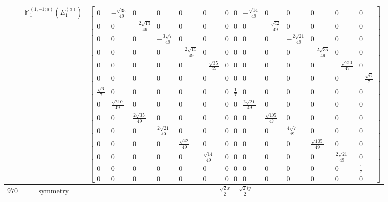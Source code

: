\documentclass[fleqn,8pt,landscape]{jsarticle}
\begin{document}
\begin{longtable}{ccc}
$  $ & $ \mathbb{M}_{1}^{(1,-1;a)}(E_{1}^{(a)}) $ & $ \begin{bmatrix} 0 & - \frac{\sqrt{35}}{49} & 0 & 0 & 0 & 0 & 0 & 0 & - \frac{\sqrt{14}}{49} & 0 & 0 & 0 & 0 & 0 \\ 0 & 0 & - \frac{2 \sqrt{14}}{49} & 0 & 0 & 0 & 0 & 0 & 0 & - \frac{\sqrt{42}}{49} & 0 & 0 & 0 & 0 \\ 0 & 0 & 0 & - \frac{3 \sqrt{7}}{49} & 0 & 0 & 0 & 0 & 0 & 0 & - \frac{2 \sqrt{21}}{49} & 0 & 0 & 0 \\ 0 & 0 & 0 & 0 & - \frac{2 \sqrt{14}}{49} & 0 & 0 & 0 & 0 & 0 & 0 & - \frac{2 \sqrt{35}}{49} & 0 & 0 \\ 0 & 0 & 0 & 0 & 0 & - \frac{\sqrt{35}}{49} & 0 & 0 & 0 & 0 & 0 & 0 & - \frac{\sqrt{210}}{49} & 0 \\ 0 & 0 & 0 & 0 & 0 & 0 & 0 & 0 & 0 & 0 & 0 & 0 & 0 & - \frac{\sqrt{6}}{7} \\ \frac{\sqrt{6}}{7} & 0 & 0 & 0 & 0 & 0 & 0 & \frac{1}{7} & 0 & 0 & 0 & 0 & 0 & 0 \\ 0 & \frac{\sqrt{210}}{49} & 0 & 0 & 0 & 0 & 0 & 0 & \frac{2 \sqrt{21}}{49} & 0 & 0 & 0 & 0 & 0 \\ 0 & 0 & \frac{2 \sqrt{35}}{49} & 0 & 0 & 0 & 0 & 0 & 0 & \frac{\sqrt{105}}{49} & 0 & 0 & 0 & 0 \\ 0 & 0 & 0 & \frac{2 \sqrt{21}}{49} & 0 & 0 & 0 & 0 & 0 & 0 & \frac{4 \sqrt{7}}{49} & 0 & 0 & 0 \\ 0 & 0 & 0 & 0 & \frac{\sqrt{42}}{49} & 0 & 0 & 0 & 0 & 0 & 0 & \frac{\sqrt{105}}{49} & 0 & 0 \\ 0 & 0 & 0 & 0 & 0 & \frac{\sqrt{14}}{49} & 0 & 0 & 0 & 0 & 0 & 0 & \frac{2 \sqrt{21}}{49} & 0 \\ 0 & 0 & 0 & 0 & 0 & 0 & 0 & 0 & 0 & 0 & 0 & 0 & 0 & \frac{1}{7} \\ 0 & 0 & 0 & 0 & 0 & 0 & 0 & 0 & 0 & 0 & 0 & 0 & 0 & 0 \end{bmatrix} $ \\ \hline
$ 970 $ & $ \text{symmetry} $ & $ \frac{\sqrt{2} x}{2} - \frac{\sqrt{2} i y}{2} $ \\

\end{longtable}
\end{document}
